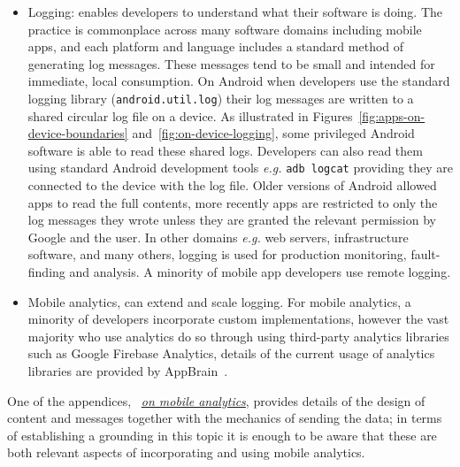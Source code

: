 \begin{itemize}
    \item Logging: enables developers to understand what their software is doing. The practice is commonplace across many software domains including mobile apps, and each platform and language includes a standard method of generating log messages. These messages tend to be small and intended for immediate, local consumption. On Android when developers use the standard logging library (\texttt{android.util.log}) their log messages are written to a shared circular log file on a device. As illustrated in Figures~\ref{fig:apps-on-device-boundaries} and~\ref{fig:on-device-logging}, some privileged Android software is able to read these shared logs. Developers can also read them using standard Android development tools \emph{e.g.} \texttt{adb logcat} providing they are connected to the device with the log file. Older versions of Android allowed apps to read the full contents, more recently apps are restricted to only the log messages they wrote unless they are granted the relevant permission by Google and the user. 
    In other domains \emph{e.g.} web servers, infrastructure software, and many others, logging is used for production monitoring, fault-finding and analysis. A minority of mobile app developers use remote logging.
    \item Mobile analytics, can extend and scale logging. For mobile analytics, a minority of developers incorporate custom implementations, however the vast majority who use analytics do so through using third-party analytics libraries such as Google Firebase Analytics, details of the current usage of analytics libraries are provided by AppBrain~.
\end{itemize}

One of the appendices, ~\href{app:on-mobile-analytics}{\textit{on mobile analytics}}, provides details of the design of content and messages together with the mechanics of sending the data; in terms of establishing a grounding in this topic it is enough to be aware that these are both relevant aspects of incorporating and using mobile analytics.


